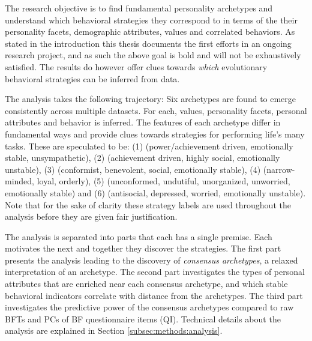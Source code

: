The research objective is to find fundamental personality archetypes and understand which behavioral strategies they correspond to in terms of the their personality facets, demographic attributes, values and correlated behaviors.
As stated in the introduction this thesis documents the first efforts in an ongoing research project, and as such the above goal is bold and will not be exhaustively satisfied.
The results do however offer clues towards \textit{which} evolutionary behavioral strategies can be inferred from data.

The analysis takes the following trajectory:
Six archetypes are found to emerge consistently across multiple datasets.
For each, values, personality facets, personal attributes and behavior is inferred.
The features of each archetype differ in fundamental ways and provide clues towards strategies for performing life's many tasks.
These are speculated to be: (1) \achiever (power/achievement driven, emotionally stable, unsympathetic), (2) \host (achievement driven, highly social, emotionally unstable), (3) \wildcard (conformist, benevolent, social, emotionally stable), (4) \loyalist (narrow-minded, loyal, orderly), (5) \hippie (unconformed, undutiful, unorganized, unworried, emotionally stable) and (6) \follower (antisocial, depressed, worried, emotionally unstable).
Note that for the sake of clarity these strategy labels are used throughout the analysis before they are given fair justification.

The analysis is separated into parts that each has a single premise.
Each motivates the next and together they discover the strategies.
The first part presents the analysis leading to the discovery of \textit{consensus archetypes}, a relaxed interpretation of an archetype.
The second part investigates the types of personal attributes that are enriched near each consensus archetype, and which stable behavioral indicators correlate with distance from the archetypes.
The third part investigates the predictive power of the consensus archetypes compared to raw BFTs and PCs of BF questionnaire items (QI).
Technical details about the analysis are explained in Section \ref{subsec:methods:analysis}.